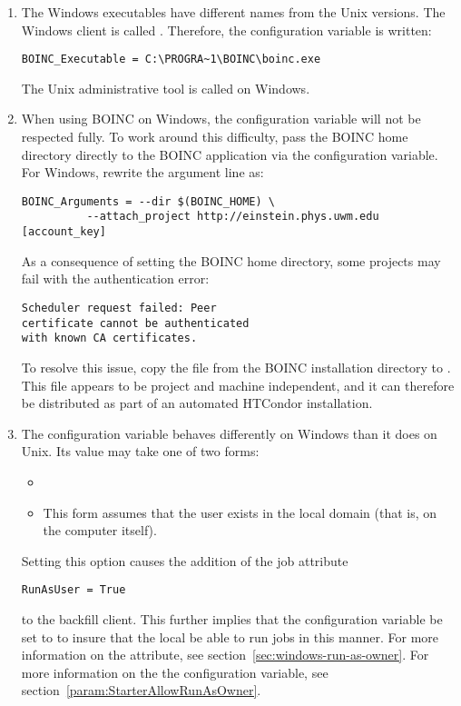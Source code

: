 \begin{enumerate}
\item
The Windows executables have different names from the Unix versions.  
The Windows client is called .
Therefore, the configuration variable  
is written:

\footnotesize
\begin{verbatim}
BOINC_Executable = C:\PROGRA~1\BOINC\boinc.exe
\end{verbatim}
\normalsize

The Unix administrative tool  
is called  on Windows.

  
\item
When using BOINC on Windows, the configuration variable
 will not be respected fully.
To work around this difficulty,
pass the BOINC home directory directly to the BOINC application
via the  configuration variable.
For Windows, rewrite the argument line as:

\footnotesize
\begin{verbatim}
BOINC_Arguments = --dir $(BOINC_HOME) \
          --attach_project http://einstein.phys.uwm.edu [account_key] 
\end{verbatim}
\normalsize

As a consequence of setting the BOINC home directory, some projects may 
fail with the authentication error:
\footnotesize
\begin{verbatim}
Scheduler request failed: Peer 
certificate cannot be authenticated 
with known CA certificates.
\end{verbatim}
\normalsize

To resolve this issue,
copy the  file
from the BOINC installation directory
to .
This file appears to be project and machine independent,
and it can therefore be distributed as part of an 
automated HTCondor installation.

\item
The  configuration variable behaves differently
on Windows than it does on Unix.
Its value may take one of two forms: 
\begin{itemize}
\item 
\verb@domain\user@
\item 
\verb@user@ This form assumes that the user exists in the local domain 
(that is, on the computer itself).
\end{itemize}

Setting this option causes the addition of the job attribute
\begin{verbatim}
RunAsUser = True
\end{verbatim}
to the backfill client.
This further implies that the configuration variable
 be set to 
to insure that the local  be able to run jobs in this 
manner.
For more information on the  attribute, 
see section~\ref{sec:windows-run-as-owner}. 
For more information on the the  
configuration variable, see 
section~\ref{param:StarterAllowRunAsOwner}.

\end{enumerate}
